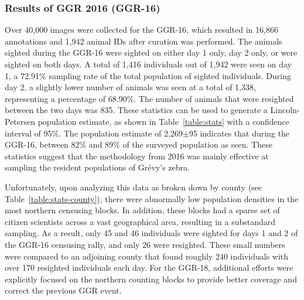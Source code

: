 \subsubsection{Results of GGR 2016 (GGR-16)}

Over 40,000 images were collected for the GGR-16, which resulted in 16,866 annotations and 1,942 animal IDs after curation was performed.  The animals sighted during the GGR-16 were sighted on either day 1 only, day 2 only, or were sighted on both days.  A total of 1,416 individuals out of 1,942 were seen on day 1, a 72.91\% sampling rate of the total population of sighted individuals.  During day 2, a slightly lower number of animals was seen at a total of 1,338, representing a percentage of 68.90\%.  The number of animals that were resighted between the two days was 835.  These statistics can be used to generate a Lincoln-Petersen population estimate, as shown in Table~\ref{table:stats} with a confidence interval of 95\%.  The population estimate of 2,269$\pm$95 indicates that during the GGR-16, between 82\% and 89\% of the surveyed population as seen.  These statistics suggest that the methodology from 2016 was mainly effective at sampling the resident populations of Gr\'evy's zebra.

Unfortunately, upon analyzing this data as broken down by county (see Table~\ref{table:stats-county}), there were abnormally low population densities in the most northern censusing blocks. In addition, these blocks had a sparse set of citizen scientists across a vast geographical area, resulting in a substandard sampling.  As a result, only 45 and 46 individuals were sighted for days 1 and 2 of the GGR-16 censusing rally, and only 26 were resighted.  These small numbers were compared to an adjoining county that found roughly 240 individuals with over 170 resighted individuals each day.  For the GGR-18, additional efforts were explicitly focused on the northern counting blocks to provide better coverage and correct the previous GGR event.

